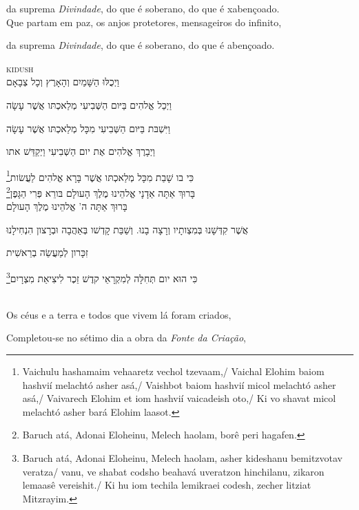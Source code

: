 da suprema \emph{Divindade},\qb{} do que é soberano, do que é xabençoado.\\[10pt]

Que partam em paz, os anjos\qb{} protetores, mensageiros do infinito,

da suprema \emph{Divindade}, \qb{}do que é soberano, do que é abençoado.

\movetoevenpage
\raggedleft

\textsc{kidush}\\[15pt]

וַיְכֻלּוּ הַשָּׁמַיִם וְהָאָרֶץ וְכָל צְבָאָם

וַיְכַל אֱלהִים בַּיּום הַשְּׁבִיעִי מְלַאכְתּו אֲשֶׁר עָשָׂה

וַיִּשְׁבּת בַּיּום הַשְּׁבִיעִי מִכָּל מְלַאכְתּו אֲשֶׁר עָשָׂה

וַיְבָרֶךְ אֱלהִים אֶת יום הַשְּׁבִיעִי וַיְקַדֵּשׁ אתו

כִּי בו שָׁבַת מִכָּל מְלַאכְתּו אֲשֶׁר בָּרָא אֱלהִים לַעֲשׂות\footnote{Vaichulu hashamaim vehaaretz vechol tzevaam,/
Vaichal Elohim baiom hashvií melachtó asher asá,/
Vaishbot baiom hashvií micol melachtó asher asá,/
Vaivarech Elohim et iom hashvií vaicadeish oto,/
Ki vo shavat micol melachtó asher bará Elohim laasot.}\\[10pt]

בָּרוּךְ אַתָּה אַדָנָי אֱלהֵינוּ מֶלֶךְ הָעולָם בּורֵא פְּרִי הַגָּפֶן\footnote{Baruch atá, Adonai Eloheinu, Melech haolam, borê peri hagafen.}\\[10pt]

בָּרוּךְ אַתָּה ה' אֱלהֵינוּ מֶלֶךְ הָעולָם

אֲשֶׁר קִדְּשָׁנוּ בְּמִצְותָיו וְרָצָה בָנוּ. וְשַׁבַּת קָדְשׁו
בְּאַהֲבָה וּבְרָצון הִנְחִילָנוּ

זִכָּרון לְמַעֲשֵׂה בְרֵאשִׁית

כִּי הוּא יום תְּחִלָּה לְמִקְרָאֵי קדֶשׁ זֵכֶר לִיצִיאַת מִצְרָיִם\footnote{Baruch atá, Adonai Eloheinu, Melech haolam, asher kideshanu bemitzvotav veratza/
vanu, ve shabat codsho beahavá uveratzon hinchilanu, zikaron lemaasê vereishit./
Ki hu iom techila lemikraei codesh, zecher litziat Mitzrayim.}

\movetooddpage
\raggedright

\textsc{}\\[15pt]

Os céus e a terra e todos que vivem lá foram criados,

Completou-se no sétimo dia a obra da \emph{Fonte da Criação},

